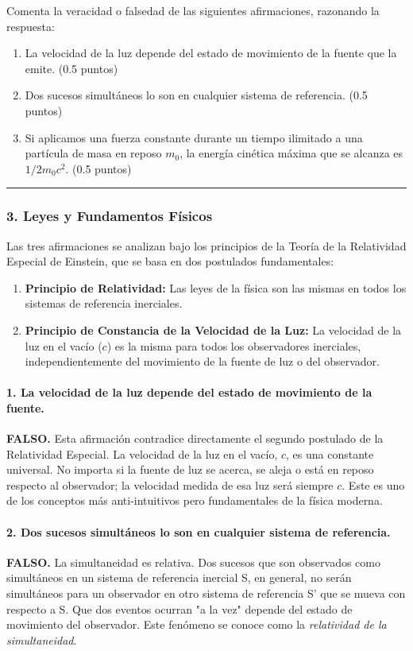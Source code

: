 \begin{cajaenunciado}
Comenta la veracidad o falsedad de las siguientes afirmaciones, razonando la respuesta:
\begin{enumerate}
    \item La velocidad de la luz depende del estado de movimiento de la fuente que la emite. (0.5 puntos)
    \item Dos sucesos simultáneos lo son en cualquier sistema de referencia. (0.5 puntos)
    \item Si aplicamos una fuerza constante durante un tiempo ilimitado a una partícula de masa en reposo $m_0$, la energía cinética máxima que se alcanza es $1/2 m_0 c^2$. (0.5 puntos)
\end{enumerate}
\end{cajaenunciado}
\hrule

\subsubsection*{3. Leyes y Fundamentos Físicos}
Las tres afirmaciones se analizan bajo los principios de la Teoría de la Relatividad Especial de Einstein, que se basa en dos postulados fundamentales:
\begin{enumerate}
    \item \textbf{Principio de Relatividad:} Las leyes de la física son las mismas en todos los sistemas de referencia inerciales.
    \item \textbf{Principio de Constancia de la Velocidad de la Luz:} La velocidad de la luz en el vacío ($c$) es la misma para todos los observadores inerciales, independientemente del movimiento de la fuente de luz o del observador.
\end{enumerate}

\paragraph{1. La velocidad de la luz depende del estado de movimiento de la fuente.}
\textbf{FALSO.} Esta afirmación contradice directamente el segundo postulado de la Relatividad Especial. La velocidad de la luz en el vacío, $c$, es una constante universal. No importa si la fuente de luz se acerca, se aleja o está en reposo respecto al observador; la velocidad medida de esa luz será siempre $c$. Este es uno de los conceptos más anti-intuitivos pero fundamentales de la física moderna.

\paragraph{2. Dos sucesos simultáneos lo son en cualquier sistema de referencia.}
\textbf{FALSO.} La simultaneidad es relativa. Dos sucesos que son observados como simultáneos en un sistema de referencia inercial S, en general, no serán simultáneos para un observador en otro sistema de referencia S' que se mueva con respecto a S. Que dos eventos ocurran "a la vez" depende del estado de movimiento del observador. Este fenómeno se conoce como la \textit{relatividad de la simultaneidad}.

